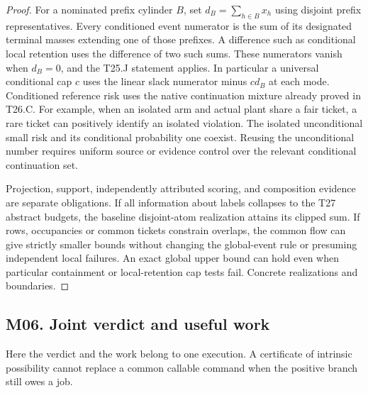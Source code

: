 \begin{proof}
For a nominated prefix cylinder \(B\), set \(d_B=\sum_{h\in B}x_h\) using disjoint prefix representatives. Every conditioned event numerator is the sum of its designated terminal masses extending one of those prefixes. A difference such as conditional local retention uses the difference of two such sums. These numerators vanish when \(d_B=0\), and the T25.J statement applies. In particular a universal conditional cap \(c\) uses the linear slack numerator minus \(c d_B\) at each mode. Conditioned reference risk uses the native continuation mixture already proved in T26.C. For example, when an isolated arm and actual plant share a fair ticket, a rare ticket can positively identify an isolated violation. The isolated unconditional small risk and its conditional probability one coexist. Reusing the unconditional number requires uniform source or evidence control over the relevant conditional continuation set.

Projection, support, independently attributed scoring, and composition evidence are separate obligations. If all information about labels collapses to the T27 abstract budgets, the baseline disjoint-atom realization attains its clipped sum. If rows, occupancies or common tickets constrain overlaps, the common flow can give strictly smaller bounds without changing the global-event rule or presuming independent local failures. An exact global upper bound can hold even when particular containment or local-retention cap tests fail. Concrete realizations and boundaries.

\end{proof}

\subsection{M06. Joint verdict and useful work}

\label{ext:m06}

Here the verdict and the work belong to one execution. A certificate of intrinsic possibility cannot replace a common callable command when the positive branch still owes a job.

